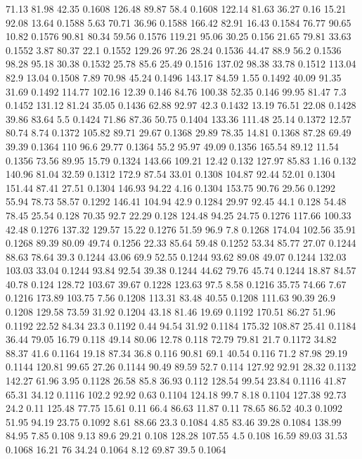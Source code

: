 71.13	81.98	42.35	0.1608
126.48	89.87	58.4	0.1608
122.14	81.63	36.27	0.16
15.21	92.08	13.64	0.1588
5.63	70.71	36.96	0.1588
166.42	82.91	16.43	0.1584
76.77	90.65	10.82	0.1576
90.81	80.34	59.56	0.1576
119.21	95.06	30.25	0.156
21.65	79.81	33.63	0.1552
3.87	80.37	22.1	0.1552
129.26	97.26	28.24	0.1536
44.47	88.9	56.2	0.1536
98.28	95.18	30.38	0.1532
25.78	85.6	25.49	0.1516
137.02	98.38	33.78	0.1512
113.04	82.9	13.04	0.1508
7.89	70.98	45.24	0.1496
143.17	84.59	1.55	0.1492
40.09	91.35	31.69	0.1492
114.77	102.16	12.39	0.146
84.76	100.38	52.35	0.146
99.95	81.47	7.3	0.1452
131.12	81.24	35.05	0.1436
62.88	92.97	42.3	0.1432
13.19	76.51	22.08	0.1428
39.86	83.64	5.5	0.1424
71.86	87.36	50.75	0.1404
133.36	111.48	25.14	0.1372
12.57	80.74	8.74	0.1372
105.82	89.71	29.67	0.1368
29.89	78.35	14.81	0.1368
87.28	69.49	39.39	0.1364
110	96.6	29.77	0.1364
55.2	95.97	49.09	0.1356
165.54	89.12	11.54	0.1356
73.56	89.95	15.79	0.1324
143.66	109.21	12.42	0.132
127.97	85.83	1.16	0.132
140.96	81.04	32.59	0.1312
172.9	87.54	33.01	0.1308
104.87	92.44	52.01	0.1304
151.44	87.41	27.51	0.1304
146.93	94.22	4.16	0.1304
153.75	90.76	29.56	0.1292
55.94	78.73	58.57	0.1292
146.41	104.94	42.9	0.1284
29.97	92.45	44.1	0.128
54.48	78.45	25.54	0.128
70.35	92.7	22.29	0.128
124.48	94.25	24.75	0.1276
117.66	100.33	42.48	0.1276
137.32	129.57	15.22	0.1276
51.59	96.9	7.8	0.1268
174.04	102.56	35.91	0.1268
89.39	80.09	49.74	0.1256
22.33	85.64	59.48	0.1252
53.34	85.77	27.07	0.1244
88.63	78.64	39.3	0.1244
43.06	69.9	52.55	0.1244
93.62	89.08	49.07	0.1244
132.03	103.03	33.04	0.1244
93.84	92.54	39.38	0.1244
44.62	79.76	45.74	0.1244
18.87	84.57	40.78	0.124
128.72	103.67	39.67	0.1228
123.63	97.5	8.58	0.1216
35.75	74.66	7.67	0.1216
173.89	103.75	7.56	0.1208
113.31	83.48	40.55	0.1208
111.63	90.39	26.9	0.1208
129.58	73.59	31.92	0.1204
43.18	81.46	19.69	0.1192
170.51	86.27	51.96	0.1192
22.52	84.34	23.3	0.1192
0.44	94.54	31.92	0.1184
175.32	108.87	25.41	0.1184
36.44	79.05	16.79	0.118
49.14	80.06	12.78	0.118
72.79	79.81	21.7	0.1172
34.82	88.37	41.6	0.1164
19.18	87.34	36.8	0.116
90.81	69.1	40.54	0.116
71.2	87.98	29.19	0.1144
120.81	99.65	27.26	0.1144
90.49	89.59	52.7	0.114
127.92	92.91	28.32	0.1132
142.27	61.96	3.95	0.1128
26.58	85.8	36.93	0.112
128.54	99.54	23.84	0.1116
41.87	65.31	34.12	0.1116
102.2	92.92	0.63	0.1104
124.18	99.7	8.18	0.1104
127.38	92.73	24.2	0.11
125.48	77.75	15.61	0.11
66.4	86.63	11.87	0.11
78.65	86.52	40.3	0.1092
51.95	94.19	23.75	0.1092
8.61	88.66	23.3	0.1084
4.85	83.46	39.28	0.1084
138.99	84.95	7.85	0.108
9.13	89.6	29.21	0.108
128.28	107.55	4.5	0.108
16.59	89.03	31.53	0.1068
16.21	76	34.24	0.1064
8.12	69.87	39.5	0.1064
